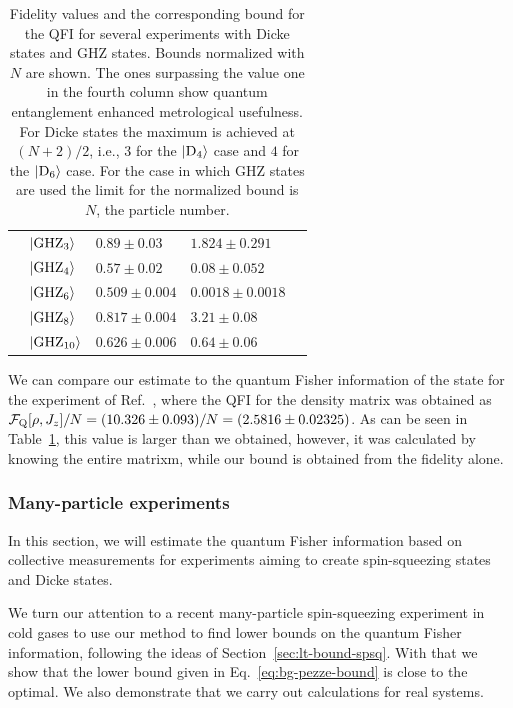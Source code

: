 \begin{table}
\begin{center}
\begin{tabular}{| l | l | l | l | l |}
      & $\vert{\textnormal{GHZ}_{3}}\rangle$  & $0.89\pm0.03$   & $1.824\pm0.291$ & \cite{Leibfried2004} \\
      & $\vert{\textnormal{GHZ}_{4}}\rangle$  & $0.57\pm0.02$   & $0.08\pm0.052$  & \cite{Sackett2000}\\
      & $\vert{\textnormal{GHZ}_{6}}\rangle$  & $0.509\pm0.004$ & $0.0018\pm0.0018$ & \cite{Leibfried2005} \\
      & $\vert{\textnormal{GHZ}_{8}}\rangle$  & $0.817\pm0.004$ & $3.21\pm0.08$ & \cite{Monz2011} \\
      & $\vert{\textnormal{GHZ}_{10}}\rangle$ & $0.626\pm0.006$ & $0.64\pm0.06$ & \cite{Monz2011} \\ \hline
    \end{tabular}
  \end{center}
  \caption[Bounds on QFI for experimental data when fidelities are measured]{Fidelity values and the corresponding bound for the QFI for several experiments with Dicke states and GHZ states.
  Bounds normalized with $N$ are shown.
  The ones surpassing the value one in the fourth column show quantum entanglement enhanced metrological usefulness.
  For Dicke states the maximum is achieved at $(N+2)/2$, i.e., $3$ for the $\vert{\ensuremath{\textnormal{D}_{4}}}\rangle$ case and $4$ for the $\vert{\ensuremath{\textnormal{D}_{6}}}\rangle$ case.
  For the case in which GHZ states are used the limit for the normalized bound is $N$, the particle number.}
  \label{tab:lt-results-for-fidelities}
\end{table}

We can compare our estimate to the quantum Fisher information of the state for the experiment of Ref.~\cite{Krischek2011}, where the QFI for the density matrix was obtained as $\mathcal{F}_{\textnormal{Q}}[{\textstyle \rho,J_z}]/N=(10.326\pm0.093)/N=(2.5816\pm0.02325)$.
As can be seen in Table~\ref{tab:lt-results-for-fidelities}, this value is larger than we obtained, however, it was calculated by knowing the entire matrixm, while our bound is obtained from the fidelity alone.

\subsubsection{Many-particle experiments}
\label{sec:lt-many-particle-experiments}

In this section, we will estimate the quantum Fisher information based on collective measurements for experiments aiming to create spin-squeezing states and Dicke states.


We turn our attention to a recent many-particle spin-squeezing experiment in cold gases to use our method to find lower bounds on the quantum Fisher information, following the ideas of Section~\ref{sec:lt-bound-spsq}.
With that we show that the lower bound given in Eq.~\eqref{eq:bg-pezze-bound} is close to the optimal.
We also demonstrate that we carry out calculations for real systems.

